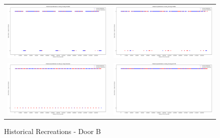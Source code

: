 \begin{figure}
  \begin{tabular}{cc}
    {\includegraphics[width = 3in]{images/results/Historical_door_B_Duckett.png}} &
    {\includegraphics[width = 3in]{images/results/Historical_door_B_FreMEn.png}} \\
    {\includegraphics[width = 3in]{images/results/Historical_door_B_Gaussian.png}} &
    {\includegraphics[width = 3in]{images/results/Historical_door_B_HyT-EM.png}} \\
  \end{tabular}
  \caption{Historical Recreations - Door B}
\end{figure}\\ \\

